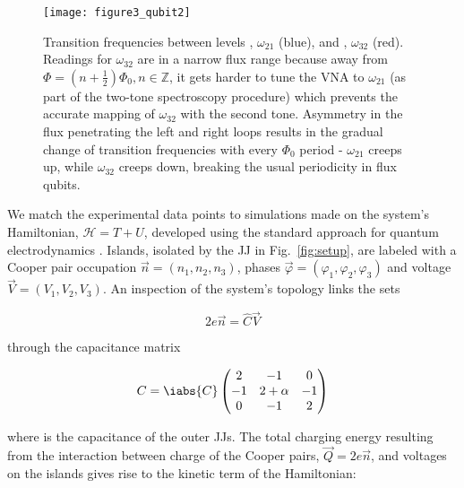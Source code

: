 

\begin{figure}[h]
  \texttt{[image: figure3\_qubit2]}
  \caption{\small Transition  frequencies between levels  \ilra {},
    $ \omega_{21}  $ (blue), and   \ilra {}, $ \omega_{32}$  (red).  Readings
    for   $  \omega_{32}   $  are   in  a   narrow  flux   range  because   away  from
    $ \Phi = (n + \frac{1}{2})\Phi_0, n\in\mathbb{Z} $, it gets harder to tune the VNA to
    $ \omega_{21}  $ (as part of  the two-tone spectroscopy procedure)  which prevents
    the accurate mapping  of $ \omega_{32} $  with the second tone.   Asymmetry in the
    flux penetrating  the left and right  loops results in the  gradual change of
    transition frequencies  with every  $ \Phi_{0}  $ period  - $\omega_{21}$  creeps up,
    while $\omega_{32}$ creeps down, breaking the usual periodicity in flux qubits.}
  \label{fig:experiment}
\end{figure}

We  match the  experimental  data  points to  simulations  made  on the  system's
Hamiltonian, $ \mathcal{H} =  T + U $, developed using  the standard approach for
quantum  electrodynamics  \cite{orlando1999}.  Islands,  isolated  by  the JJ  in
Fig.~\ref{fig:setup},    are   labeled    with   a    Cooper   pair    occupation
$       \vec{n}        =       (n_1,       n_2,       n_3)        $,       phases
$      \vec{\varphi}      =      (\varphi_1,      \varphi_2,      \varphi_3)      $      and      voltage
$ \vec{V}  = \left(V_{1}, V_{2}, V_{3}\right)  $.  An inspection of  the system's
topology links the sets

\begin{equation}
  \label{eq:link}
  2e\vec{n} = \hat{C}\vec{V}
\end{equation}

\noindent through the capacitance matrix

\begin{equation}
  \label{eq:capac}
  C = \iabs{C} \begin{pmatrix}
    2  &  -1  &  0\\
    -1  &  2  +  \alpha  &  -1\\
    0  &  -1  & 2
  \end{pmatrix}
\end{equation}

\noindent where  is the capacitance of the outer JJs.  The total charging
energy  resulting  from the  interaction  between  charge  of the  Cooper  pairs,
$ \vec{Q}=2e\vec{n} $, and voltages on the islands gives rise to the kinetic term
of the Hamiltonian:


